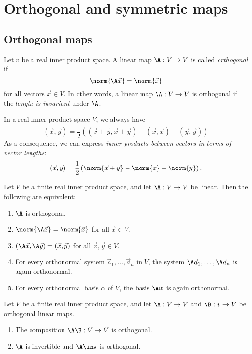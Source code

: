 \section{Orthogonal and symmetric maps}

\subsection{Orthogonal maps}
\begin{definition}
    Let $v$ be a real inner product space. A linear map $\A: V \to V$ is called \emph{orthogonal} if
    $$\norm{\A\vec{x}} = \norm{\vec{x}}$$
    for all vectors $\vec{x} \in V$. In other words, a linear map $\A: V \to V$ is orthogonal if the \emph{length is invariant} under $\A$.
\end{definition}

\begin{theorem}
    In a real inner product space $V$, we always have
    $$(\vec{x},\vec{y}) = \frac{1}{2}\left((\vec{x}+\vec{y},\vec{x}+\vec{y})-(\vec{x},\vec{x})-(\vec{y},\vec{y})\right)$$
    As a consequence, we can express \emph{inner products between vectors in terms of vector lengths}:
    $$(\vec{x},\vec{y}) = \frac{1}{2}\left(\norm{\vec{x}+\vec{y}}-\norm{x}-\norm{y}\right).$$
\end{theorem}

\begin{theorem}
    Let $V$ be a finite real inner product space, and let $\A: V \to V$ be linear. Then the following are equivalent:
    \begin{enumerate}
        \item $\A$ is orthogonal.
        \item $\norm{\A\vec{x}} = \norm{\vec{x}}$ for all $\vec{x} \in V$.
        \item $(\A\vec{x},\A\vec{y}) = (\vec{x},\vec{y})$ for all $\vec{x},\vec{y} \in V$.
        \item For every orthonormal system $\vec{a}_1,\dots,\vec{a}_n$ in $V$, the system $\A\vec{a}_1,\dots,\A\vec{a}_n$ is again orthonormal.
        \item For every orthonormal basis $\alpha$ of $V$, the basis $\A\alpha$ is again orthonormal.
    \end{enumerate}
\end{theorem}

\begin{theorem}
    Let $V$ be a finite real inner product space, and let $\A: V \to V$ and $\B: v \to V$ be orthogonal linear maps. 
    \begin{enumerate}
        \item The composition $\A\B: V \to V$ is orthogonal.
        \item $\A$ is invertible and $\A\inv$ is orthogonal.
    \end{enumerate}
\end{theorem}

